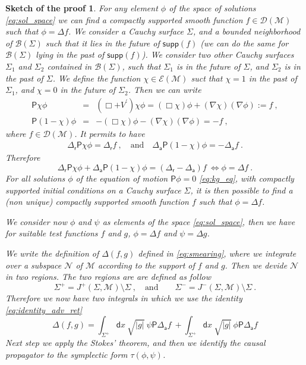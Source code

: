 \documentclass[11pt]{book}
\newcommand{\supp}{\mathsf{supp}}
\newcommand{\abs}[1]{\left|#1\right|}
\newcommand{\Bcal}{\mathcal{B}}
\newcommand{\Dcal}{\mathcal{D}}
\newcommand{\Ecal}{\mathcal{E}}
\newcommand{\Mcal}{\mathcal{M}}
\newcommand{\Ncal}{\mathcal{N}}
\newcommand{\Psf}{\mathsf{P}}
\newcommand{\asf}{\mathsf{a}}
\newcommand{\dsf}{\mathsf{d}}
\newcommand{\rsf}{\mathsf{r}}
\theoremstyle{break}
\newtheorem{sketch}{Sketch of the proof}[chapter]
\begin{document}
\begin{sketch}
For any element $\phi$ of the space of solutions \eqref{eq:sol_space} we can find a compactly supported smooth function $f \in \Dcal(\Mcal)$ such that $\phi = \Delta f$. We consider a Cauchy surface $\Sigma$, and a bounded neighborhood of $\Bcal(\Sigma)$ such that it lies in the future of $\supp(f)$ (we can do the same for $\Bcal(\Sigma)$ lying in the past of $\supp(f)$). We consider two other Cauchy surfaces $\Sigma_1$ and $\Sigma_2$ contained in $\Bcal(\Sigma)$, such that $\Sigma_1$ is in the future of $\Sigma$, and $\Sigma_2$ is in the past of $\Sigma$. We define the function $\chi \in \Ecal(\Mcal)$ suct that $\chi =1$ in the past of $\Sigma_1$, and $\chi = 0$ in the future of $\Sigma_2$. Then we can write
%
\begin{eqnarray*}
\Psf \chi \phi &=& (\Box + V^\prime) \chi \phi = (\Box \chi) \phi + (\nabla \chi) (\nabla \phi) := f \ , \\
\Psf (1- \chi)\phi &=& - (\Box \chi) \phi - (\nabla \chi) (\nabla \phi) = - f \ , 
\end{eqnarray*}
%
where $f \in \Dcal(\Mcal)$. It permits to have
%
\begin{eqnarray*}
\Delta_\rsf \Psf \chi \phi = \Delta_\rsf f \ , \quad \mbox{and} \quad  \Delta_\asf \Psf (1-\chi) \phi = - \Delta_\asf f \ .
\end{eqnarray*}
%
Therefore
%
\begin{equation*}
\Delta_\rsf \Psf \chi \phi + \Delta_\asf \Psf (1-\chi) \phi = (\Delta_\rsf - \Delta_\asf) f \ \Leftrightarrow \phi = \Delta f \ .
\end{equation*}
%
For all solutions $\phi$ of the equation of motion $\Psf \phi =0$ \eqref{eq:kg_eq}, with compactly supported initial conditions on a Cauchy surface $\Sigma$, it is then possible to find a (non unique) compactly supported smooth function $f$ such that $\phi = \Delta f$.\par%
%
We consider now $\phi$ and $\psi$ as elements of the space \eqref{eq:sol_space}, then we have for suitable test functions $f$ and $g$, $\phi=\Delta f$ and $\psi=\Delta g$.\par%
%
We write the definition of $\Delta(f,g)$ defined in \eqref{eq:smearing}, where we integrate over a subspace $\Ncal$ of $\Mcal$ according to the support of $f$ and $g$. Then we devide $\Ncal$ in two regions. The two regions are are defined as follow
%
\begin{equation*}
\Sigma^+ = J^+(\Sigma,\Mcal) \setminus \Sigma \ , \quad \mbox{and} \qquad \Sigma^- = J^-(\Sigma,\Mcal) \setminus \Sigma \ .
\end{equation*}
%
Therefore we now have  two integrals in which we use the identity \eqref{eq:identity_adv_ret}
%
\begin{equation*}
\Delta(f,g) = \int_{\Sigma^+} \dsf x \ \sqrt{\abs{g}} \ \psi \Psf \Delta_\asf f \ + \int_{\Sigma^+} \dsf x \ \sqrt{\abs{g}} \ \phi \Psf \Delta_\asf f
\end{equation*}
%
Next step we apply the Stokes' theorem, and then we identify the causal propagator to the symplectic form $\tau(\phi,\psi)$. 
\end{sketch}
\end{document}
